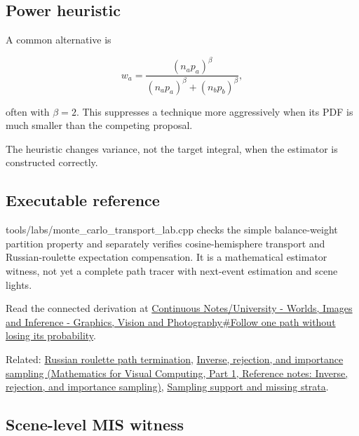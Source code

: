 \subsection{Power heuristic}\label{appendix-ca8898faf1a6-power-heuristic}

\hypertarget{appendix-ca8898faf1a6-power-heuristic}{}

A common alternative is

\[
w_a=
\frac{(n_a p_a)^\beta}
{(n_a p_a)^\beta+(n_b p_b)^\beta},
\]

often with \(\beta=2\). This suppresses a technique more aggressively when its PDF is much smaller than the competing proposal.

The heuristic changes variance, not the target integral, when the estimator is constructed correctly.

\subsection{Executable reference}\label{appendix-ca8898faf1a6-executable-reference}

\hypertarget{appendix-ca8898faf1a6-executable-reference}{}

tools/labs/monte\_carlo\_transport\_lab.cpp checks the simple balance-weight partition property and separately verifies cosine-hemisphere transport and Russian-roulette expectation compensation. It is a mathematical estimator witness, not yet a complete path tracer with next-event estimation and scene lights.

Read the connected derivation at \hyperref[03-visual-computing-i-ch007-follow-one-path-without-losing-its-probability]{Continuous Notes/University - Worlds, Images and Inference - Graphics, Vision and Photography\#Follow one path without losing its probability}.

Related: \hyperref[appendix-7277c62d4599]{Russian roulette path termination}, \href{../02-Mathematics-for-Visual-Computing-P01/main.pdf\#appendix-8d863ed954d0}{Inverse, rejection, and importance sampling (Mathematics for Visual Computing, Part 1, Reference notes: Inverse, rejection, and importance sampling)}, \hyperref[appendix-10308c3d753e]{Sampling support and missing strata}.

\subsection{Scene-level MIS witness}\label{appendix-ca8898faf1a6-scene-level-mis-witness}

